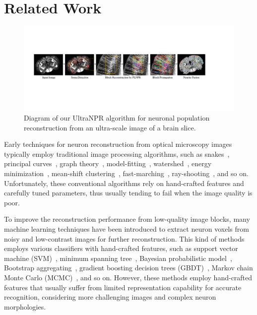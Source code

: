 \section{Related Work}
\label{sec:related work}
\begin{figure}[ht]
	\centering
	\includegraphics[width=1\textwidth]{./Illustrations/framework_ultranpr.pdf}
	\caption{Diagram of our UltraNPR algorithm for neuronal population reconstruction from an ultra-scale image of a brain slice.}
	\label{fig:ultra_framework}
\end{figure}


Early techniques for neuron reconstruction from optical microscopy images typically employ traditional image processing algorithms, such as snakes~\cite{Wang2011, Cai2006}, principal curves~\cite{Bas2011}, graph theory~\cite{Peng2010a, Yang2013, De2016}, model-fitting~\cite{Zhao2011, Santamaria2015}, watershed~\cite{Navlakha2013, Suembuel2016}, energy minimization~\cite{Quan2013, Liu2016}, mean-shift clustering~\cite{Frasconi2014}, fast-marching~\cite{Peng2011, Xiao2013, Liu2018}, ray-shooting~\cite{Wu2014, Liu2019}, and so on.
Unfortunately, these conventional algorithms rely on hand-crafted features and carefully tuned parameters, thus usually tending to fail when the image quality is poor.

To improve the reconstruction performance from low-quality image blocks, many machine learning techniques have been introduced to extract neuron voxels from noisy and low-contrast images for further reconstruction. 
This kind of methods employs various classifiers with hand-crafted features, such as support vector machine (SVM)~\cite{Chen2015}, minimum spanning tree~\cite{Basu2016}, Bayesian probabilistic model~\cite{Radojevic2017}, Bootstrap aggregating~\cite{Wang2017}, gradient boosting decision trees (GBDT)~\cite{Gu2017}, Markov chain Monte Carlo (MCMC)~\cite{Skibbe2015, Skibbe2019}, and so on.
However, these methods employ hand-crafted features that usually suffer from limited representation capability for accurate recognition, considering more challenging images and complex neuron morphologies.


